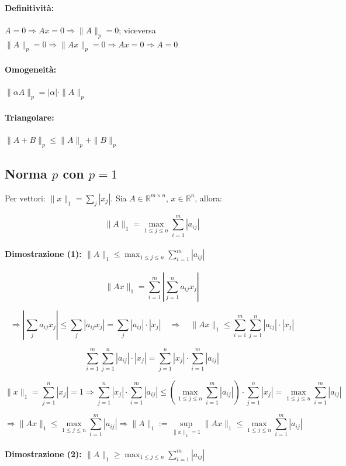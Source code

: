 \documentclass[12pt,a4paper]{article}
\begin{document}
\paragraph{Definitività:} $A = 0 \Rightarrow Ax = 0 \Rightarrow \|A\|_p = 0$; viceversa $\|A\|_p = 0 \Rightarrow \|Ax\|_p = 0 \Rightarrow Ax = 0 \Rightarrow A = 0$

\paragraph{Omogeneità:} $\|\alpha A\|_p = |\alpha| \cdot \|A\|_p$

\paragraph{Triangolare:} $\|A + B\|_p \le \|A\|_p + \|B\|_p$

\subsection*{Norma $p$ con $p=1$}

Per vettori: $\|x\|_1 = \sum_j |x_j|$.  
Sia $A \in \mathbb{R}^{m \times n}$, $x \in \mathbb{R}^n$, allora:

\[\|A\|_1 = \max_{1 \le j \le n} \sum_{i=1}^m |a_{ij}|\]
\paragraph{Dimostrazione (1): $\|A\|_1 \le \max_{1 \le j \le n} \sum_{i=1}^m |a_{ij}|$}

\[
\|Ax\|_1 = \sum_{i=1}^m \left| \sum_{j=1}^n a_{ij} x_j \right|
\]

\[
\Rightarrow \left| \sum_j a_{ij} x_j \right| \le \sum_j |a_{ij} x_j| = \sum_j |a_{ij}| \cdot |x_j|
\quad \Rightarrow \quad
\|Ax\|_1 \le \sum_{i=1}^m \sum_{j=1}^n |a_{ij}| \cdot |x_j|
\]

\[
\sum_{i=1}^m \sum_{j=1}^n |a_{ij}| \cdot |x_j| = \sum_{j=1}^n |x_j| \cdot \sum_{i=1}^m |a_{ij}|
\]

\[
\|x\|_1 = \sum_{j=1}^n |x_j| = 1
\Rightarrow
\sum_{j=1}^n |x_j| \cdot \sum_{i=1}^m |a_{ij}| \le 
\left( \max_{1 \le j \le n} \sum_{i=1}^m |a_{ij}| \right) \cdot \sum_{j=1}^n |x_j| = \max_{1 \le j \le n} \sum_{i=1}^m |a_{ij}|
\]

\[
\Rightarrow \|Ax\|_1 \le \max_{1 \le j \le n} \sum_{i=1}^m |a_{ij}|
\Rightarrow \|A\|_1 := \sup_{\|x\|_1 = 1} \|Ax\|_1 \le \max_{1 \le j \le n} \sum_{i=1}^m |a_{ij}|
\]

\paragraph{Dimostrazione (2): $\|A\|_1 \ge \max_{1 \le j \le n} \sum_{i=1}^m |a_{ij}|$}
\end{document}
